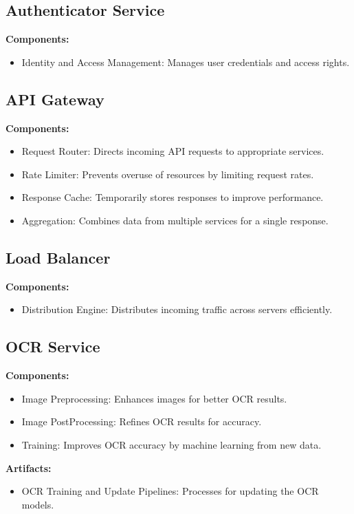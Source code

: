 \documentclass{article}
\begin{document}
\subsection{Authenticator Service}
\textbf{Components:}
\begin{itemize}
    \item Identity and Access Management: Manages user credentials and access rights.
\end{itemize}

\subsection{API Gateway}
\textbf{Components:}
\begin{itemize}
    \item Request Router: Directs incoming API requests to appropriate services.
    \item Rate Limiter: Prevents overuse of resources by limiting request rates.
    \item Response Cache: Temporarily stores responses to improve performance.
    \item Aggregation: Combines data from multiple services for a single response.
\end{itemize}

\subsection{Load Balancer}
\textbf{Components:}
\begin{itemize}
    \item Distribution Engine: Distributes incoming traffic across servers efficiently.
\end{itemize}

\subsection{OCR Service}
\textbf{Components:}
\begin{itemize}
    \item Image Preprocessing: Enhances images for better OCR results.
    \item Image PostProcessing: Refines OCR results for accuracy.
    \item Training: Improves OCR accuracy by machine learning from new data.
\end{itemize}
\textbf{Artifacts:}
\begin{itemize}
    \item OCR Training and Update Pipelines: Processes for updating the OCR models.
\end{itemize}
\end{document}
